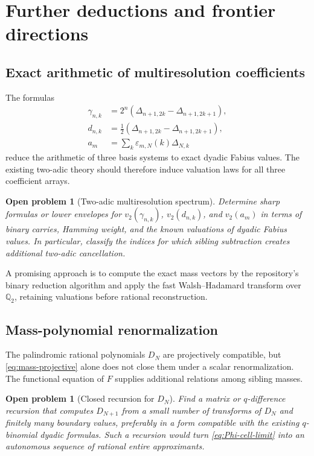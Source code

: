 \documentclass[11pt,oneside]{article}
\newtheorem{openproblem}[theorem]{Open problem}
\theoremstyle{definition}
\theoremstyle{remark}
\newcommand{\Q}{\mathbb Q}
\begin{document}
\section{Further deductions and frontier directions}
\label{sec:frontiers}

\subsection{Exact arithmetic of multiresolution coefficients}

The formulas
\begin{align*}
 \gamma_{n,k}&=2^n(\Delta_{n+1,2k}-\Delta_{n+1,2k+1}),\\
 d_{n,k}&=\tfrac12(\Delta_{n+1,2k}-\Delta_{n+1,2k+1}),\\
 a_m&=\sum_k\varepsilon_{m,N}(k)\Delta_{N,k}
\end{align*}
reduce the arithmetic of three basis systems to exact dyadic Fabius values.
The existing two-adic theory should therefore induce valuation laws for all
three coefficient arrays.

\begin{openproblem}[Two-adic multiresolution spectrum]
\label{op:two-adic-spectrum}
Determine sharp formulas or lower envelopes for
$v_2(\gamma_{n,k})$, $v_2(d_{n,k})$, and $v_2(a_m)$ in terms of binary carries,
Hamming weight, and the known valuations of dyadic Fabius values.  In
particular, classify the indices for which sibling subtraction creates
additional two-adic cancellation.
\end{openproblem}

A promising approach is to compute the exact mass vectors by the repository's
binary reduction algorithm and apply the fast Walsh--Hadamard transform over
$\Q_2$, retaining valuations before rational reconstruction.

\subsection{Mass-polynomial renormalization}

The palindromic rational polynomials $D_N$ are projectively compatible, but
\eqref{eq:mass-projective} alone does not close them under a scalar
renormalization.  The functional equation of $F$ supplies additional relations
among sibling masses.

\begin{openproblem}[Closed recursion for $D_N$]
\label{op:DN-recursion}
Find a matrix or $q$-difference recursion that computes $D_{N+1}$ from a small
number of transforms of $D_N$ and finitely many boundary values, preferably in
a form compatible with the existing $q$-binomial dyadic formulas.  Such a
recursion would turn \eqref{eq:Phi-cell-limit} into an autonomous sequence of
rational entire approximants.
\end{openproblem}
\end{document}
